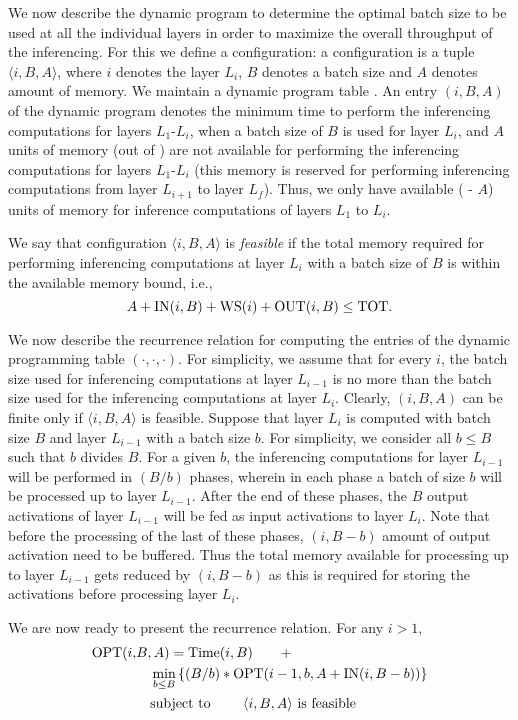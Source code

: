 We now describe the dynamic program to determine the optimal batch size
to be used at all the individual layers in order to maximize the overall
throughput of the inferencing.
For this we define a configuration:
a configuration is a tuple $\langle i, B, A \rangle$,
where $i$ denotes the layer $L_i$, $B$ denotes a batch size and 
$A$ denotes amount of memory.
We maintain a dynamic program table {\OPT}. 
An entry \OPT$(i, B, A)$ of the dynamic program denotes the minimum time to perform the inferencing computations for layers $L_1$-$L_i$, when a batch size of 
$B$ is used for layer $L_i$, and $A$ units of memory (out of {\TOT}) are not available for performing the inferencing computations for layers $L_1$-$L_i$ (this memory is reserved for performing inferencing computations from layer $L_{i+1}$ to layer $L_f$).
Thus, we only have available ({\TOT} - $A$) units of memory
for inference computations of layers $L_1$ to $L_i$.

We say that configuration $\langle i,B,A \rangle$ is {\em feasible} if
the total memory required for performing inferencing computations at
layer $L_i$ with a batch size of $B$ is within the available memory bound,
i.e.,
$$A + {\rm IN}(i,B) + {\rm WS}(i) +  {\rm OUT}(i,B) \leq {\rm TOT}.$$

We now describe the recurrence relation for computing the 
entries of the dynamic programming table \OPT$(\cdot, \cdot, \cdot)$.
For simplicity, we assume that for every $i$, the batch size used for inferencing computations at layer $L_{i-1}$ is no more than
the batch size used for the inferencing computations at layer $L_i$.
Clearly,  \OPT$(i, B, A)$ can be finite only if  $\langle i,B,A \rangle$ is feasible.
Suppose that layer $L_i$ is computed with batch size $B$ and layer $L_{i-1}$ with a batch size $b$. 
For simplicity, we consider all $b \leq B$ such that $b$ divides $B$.
For a given $b$, 
the inferencing computations for layer $L_{i-1}$
will be performed in $ (B/b)$ phases, wherein in each phase
a batch of size $b$ will be processed up to layer $L_{i-1}$.
After the end of these phases, the $B$ output activations of 
layer $L_{i-1}$ will be fed as input activations to layer $L_i$.
Note that before the processing of the last of these phases,
\IN$(i,B-b)$ amount of output activation need to be buffered. 
Thus the total memory available for processing up to
layer $L_{i-1}$ gets reduced by \IN$(i, B-b)$ as this is required
for storing the activations before processing layer $L_i$.

We are now ready to present the recurrence relation.
For any $i > 1$, 
\begin{equation*}
\begin{split}
{\rm OPT}(i, &B, A)   =  {\rm Time}(i,B) \quad \quad  +   \\
 &\quad  \min \limits_{b \leq B} \left \{  (B/b) * {\rm OPT}(i-1,b,A+{\rm IN}(i,B-b)) \right \}\\
 &\quad \mbox{subject to} \quad \quad  \text{ $\langle i,B,A \rangle$ is feasible}
\end{split}
\end{equation*}



